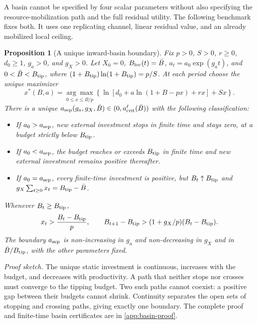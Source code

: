 \documentclass[11pt,a4paper]{article}
\newtheorem{proposition}{Proposition}
\theoremstyle{definition}\newtheorem{definition}{Definition}
\begin{document}
A basin cannot be specified by four scalar parameters without also
specifying the resource-mobilization path and the full residual utility.
The following benchmark fixes both. It uses one replicating channel,
linear residual value, and an already mobilized local ceiling.

\begin{proposition}[A unique inward-basin boundary]
\label{prop:basin}
Fix $p>0$, $S>0$, $r\geq0$, $d_0\geq1$, $g_a>0$, and $g_X>0$.
Let $X_0=0$, $B_{\rm loc}(t)=\bar B$, $a_t=a_0\exp(g_at)$, and
$0<\bar B<B_{\rm tip}$, where
$(1+B_{\rm tip})\ln(1+B_{\rm tip})=p/S$.
At each period choose the unique maximizer
\begin{equation}
 x^*(B,a)=\underset{0\leq x\leq B/p}{\arg\max}
 \left\{\ln[d_0+a\ln(1+B-px)+rx]+Sx\right\}.
 \label{eq:basin-policy}
\end{equation}
There is a unique
$a_{\rm sep}(g_a,g_X,\bar B)\in(0,a_{\rm crit}^{\ell}(\bar B))$
with the following classification:
\begin{itemize}[leftmargin=*,nosep]
\item If $a_0>a_{\rm sep}$, new external investment stops in finite time
and stays zero, at a budget strictly below $B_{\rm tip}$.
\item If $a_0<a_{\rm sep}$, the budget reaches or exceeds $B_{\rm tip}$
in finite time and new external investment remains positive thereafter.
\item If $a_0=a_{\rm sep}$, every finite-time investment is positive,
but $B_t\uparrow B_{\rm tip}$ and
$g_X\sum_{t\geq0}x_t=B_{\rm tip}-\bar B$.
\end{itemize}
Whenever $B_t\geq B_{\rm tip}$,
\begin{equation}
 x_t>\frac{B_t-B_{\rm tip}}p,\qquad
 B_{t+1}-B_{\rm tip}>
 (1+g_X/p)(B_t-B_{\rm tip}).
 \label{eq:runaway-bound}
\end{equation}
The boundary $a_{\rm sep}$ is non-increasing in $g_a$ and
non-decreasing in $g_X$ and in $\bar B/B_{\rm tip}$, with the other
parameters fixed.
\end{proposition}
\noindent\emph{Proof sketch.}
The unique static investment is continuous, increases with the budget,
and decreases with productivity. A path that neither stops nor crosses
must converge to the tipping budget. Two such paths cannot coexist:
a positive gap between their budgets cannot shrink. Continuity separates
the open sets of stopping and crossing paths, giving exactly one boundary.
The complete proof and finite-time basin certificates are in
\cref{app:basin-proof}.
\end{document}
